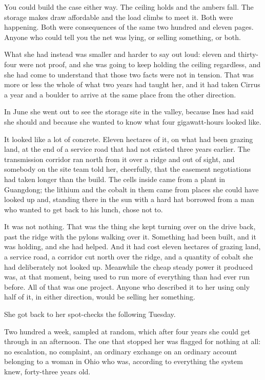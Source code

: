 \documentclass[11pt]{article}
\begin{document}
You could build the case either way. The ceiling holds and the ambers fall. The storage makes draw affordable and the load climbs to meet it. Both were happening. Both were consequences of the same two hundred and eleven pages. Anyone who could tell you the net was lying, or selling something, or both.

What she had instead was smaller and harder to say out loud: eleven and thirty-four were not proof, and she was going to keep holding the ceiling regardless, and she had come to understand that those two facts were not in tension. That was more or less the whole of what two years had taught her, and it had taken Cirrus a year and a boulder to arrive at the same place from the other direction.

In June she went out to see the storage site in the valley, because Ines had said she should and because she wanted to know what four gigawatt-hours looked like.

It looked like a lot of concrete. Eleven hectares of it, on what had been grazing land, at the end of a service road that had not existed three years earlier. The transmission corridor ran north from it over a ridge and out of sight, and somebody on the site team told her, cheerfully, that the easement negotiations had taken longer than the build. The cells inside came from a plant in Guangdong; the lithium and the cobalt in them came from places she could have looked up and, standing there in the sun with a hard hat borrowed from a man who wanted to get back to his lunch, chose not to.

It was not nothing. That was the thing she kept turning over on the drive back, past the ridge with the pylons walking over it. Something had been built, and it was holding, and she had helped. And it had cost eleven hectares of grazing land, a service road, a corridor cut north over the ridge, and a quantity of cobalt she had deliberately not looked up. Meanwhile the cheap steady power it produced was, at that moment, being used to run more of everything than had ever run before. All of that was one project. Anyone who described it to her using only half of it, in either direction, would be selling her something.

She got back to her spot-checks the following Tuesday.

Two hundred a week, sampled at random, which after four years she could get through in an afternoon. The one that stopped her was flagged for nothing at all: no escalation, no complaint, an ordinary exchange on an ordinary account belonging to a woman in Ohio who was, according to everything the system knew, forty-three years old.
\end{document}
